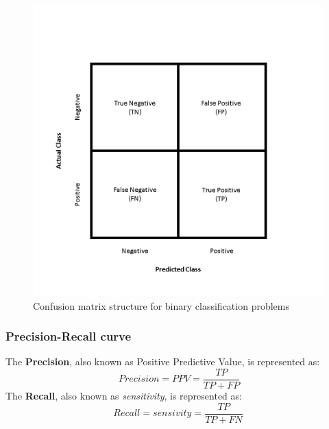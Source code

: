 \begin{figure}
    \centering
    \includegraphics[width=0.7\linewidth]{images/implementation/binary_classification.png}
    \caption{Confusion matrix structure for binary classification problems}
    \label{fig:classification}
\end{figure}


\subsubsection{Precision-Recall curve}
The \textbf{Precision}, also known as Positive Predictive Value, is represented as:
\[\ Precision = PPV = \frac{TP}{TP + FP} \] 
The \textbf{Recall}, also known as \textit{sensitivity}, is represented as:
\[ Recall = sensivity = \frac{TP}{TP + FN} \] 